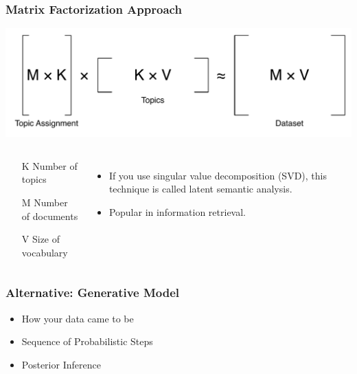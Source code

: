 

\frame
{
  \frametitle{Matrix Factorization Approach}

\begin{center}
\includegraphics[width=0.9\linewidth]{topic_models/factorization.pdf}
\end{center}

\begin{columns}
\begin{block}{}
	\begin{itemize}
		\item[K] Number of topics
		\item[M] Number of documents
		\item[V] Size of vocabulary
	\end{itemize}
\end{block}
\pause
\begin{itemize}
\item If you use singular value decomposition (SVD), this technique is called latent semantic analysis.
\item Popular in information retrieval.
\end{itemize}
\end{columns}

}

\begin{frame}

\frametitle{Alternative: Generative Model}

\begin{itemize}
  \item How your data came to be
  \item Sequence of Probabilistic Steps
  \item Posterior Inference
\end{itemize}

\end{frame}

